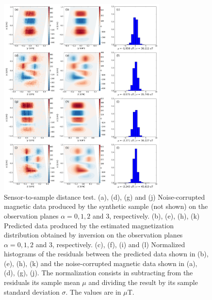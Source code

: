 \documentclass[galley,gc]{agutex}
\begin{document}
 \begin{figure}
 \noindent \includegraphics[width=20pc]{Figs/Fig9_LQ.png}
 \caption{Sensor-to-sample distance test. (a), (d), (g) and (j) Noise-corrupted
 magnetic data produced by the synthetic sample (not shown) on the
 observation planes $\alpha = 0, 1, 2$ and $3$, respectively.
 (b), (e), (h), (k) Predicted data produced by the estimated
 magnetization distribution obtained by inversion on the
 observation planes $\alpha = 0, 1, 2$ and $3$, respectively.
 (c), (f), (i) and (l) Normalized histograms of the residuals between the
 predicted data shown in (b), (e), (h), (k) and the 
 noise-corrupted magnetic data shown in (a), (d), (g), (j). 
 The normalization
 consists in subtracting from the residuals its sample mean $\mu$ 
 and dividing the result by its sample standard deviation $\sigma$.
 The values are in $\mu$T.}
 \label{fig:datafit-sensor2sample}
 \end{figure}
 
\end{document}
